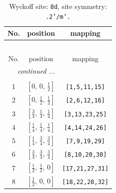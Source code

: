 \documentclass[fleqn,8pt]{jsarticle}
\begin{document}
\begin{longtable}{ccc}
\caption{Wyckoff site: {\tt 8d}, site symmetry: {\tt .2'/m'.}}
 \\
 \hline \hline
No. & position & mapping \\ \hline \endfirsthead

\multicolumn{2}{l}{\tablename\ \thetable{}} \\
 \hline \hline
No. & position & mapping \\ \hline \endhead

 \hline \hline
\multicolumn{2}{r}{\footnotesize\it continued ...} \\ \endfoot

 \hline \hline
\multicolumn{2}{r}{} \\ \endlastfoot

1 & $\left[ 0,\, 0,\, \frac{1}{2} \right]$ & {\tt [1,5,11,15]} \\ \hline
2 & $\left[ 0,\, \frac{1}{2},\, \frac{1}{2} \right]$ & {\tt [2,6,12,16]} \\ \hline
3 & $\left[ \frac{3}{4},\, \frac{1}{4},\, \frac{1}{4} \right]$ & {\tt [3,13,23,25]} \\ \hline
4 & $\left[ \frac{1}{4},\, \frac{1}{4},\, \frac{1}{4} \right]$ & {\tt [4,14,24,26]} \\ \hline
5 & $\left[ \frac{1}{4},\, \frac{3}{4},\, \frac{3}{4} \right]$ & {\tt [7,9,19,29]} \\ \hline
6 & $\left[ \frac{3}{4},\, \frac{3}{4},\, \frac{3}{4} \right]$ & {\tt [8,10,20,30]} \\ \hline
7 & $\left[ \frac{1}{2},\, \frac{1}{2},\, 0 \right]$ & {\tt [17,21,27,31]} \\ \hline
8 & $\left[ \frac{1}{2},\, 0,\, 0 \right]$ & {\tt [18,22,28,32]} \\
\end{longtable}
\renewcommand{\arraystretch}{1.2}
\end{document}

